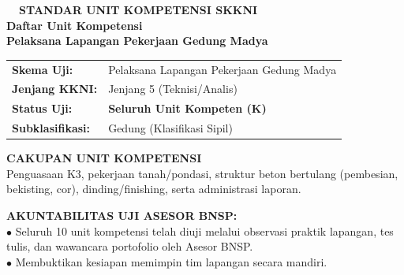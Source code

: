 \documentclass[10pt,a4paper,landscape]{article}
\begin{document}
\noindent
\begin{minipage}[t]{0.30\linewidth}
  \vspace{0pt}
  \begin{tcolorbox}[sharp corners, boxrule=0.8pt, colframe=pborder, colback=white, left=3mm, right=3mm, top=2.5mm, bottom=2.5mm, height=100mm]
    \colorbox{pred}{\fontsize{7pt}{8pt}\selectfont\bfseries\color{white}\ \ STANDAR UNIT KOMPETENSI SKKNI\ \ }\\[1.5mm]
    {\fontsize{9.5pt}{11.5pt}\selectfont\bfseries\color{pnavy}Daftar Unit Kompetensi}\\[0.5mm]
    {\fontsize{7pt}{8.5pt}\selectfont\bfseries\color{pred}Pelaksana Lapangan Pekerjaan Gedung Madya}\\[2mm]

    \begin{tcolorbox}[sharp corners, boxrule=0.5pt, colframe=pborder, colback=pbglight, left=2mm, right=2mm, top=1.5mm, bottom=1.5mm]
      \begin{tabularx}{\linewidth}{@{}p{22mm} X@{}}
        {\fontsize{6.8pt}{8pt}\selectfont\bfseries Skema Uji:} & {\fontsize{6.8pt}{8pt}\selectfont Pelaksana Lapangan Pekerjaan Gedung Madya} \\[0.8mm]
        {\fontsize{6.8pt}{8pt}\selectfont\bfseries Jenjang KKNI:} & {\fontsize{6.8pt}{8pt}\selectfont Jenjang 5 (Teknisi/Analis)} \\[0.8mm]
        {\fontsize{6.8pt}{8pt}\selectfont\bfseries Status Uji:} & {\fontsize{6.8pt}{8pt}\selectfont\bfseries\color{pred} Seluruh Unit Kompeten (K)} \\[0.8mm]
        {\fontsize{6.8pt}{8pt}\selectfont\bfseries Subklasifikasi:} & {\fontsize{6.8pt}{8pt}\selectfont Gedung (Klasifikasi Sipil)}
      \end{tabularx}
    \end{tcolorbox}
    \vspace{1.5mm}

    {\fontsize{7.5pt}{9pt}\selectfont\bfseries\color{pnavy}CAKUPAN UNIT KOMPETENSI}\\[0.8mm]
    {\fontsize{6.5pt}{8.2pt}\selectfont\color{psteel}
    Penguasaan K3, pekerjaan tanah/pondasi, struktur beton bertulang (pembesian, bekisting, cor), dinding/finishing, serta administrasi laporan.
    }
  \end{tcolorbox}
  \vspace{2mm}

  \begin{tcolorbox}[sharp corners, boxrule=0.6pt, colframe=pnavy, colback=pbglight, left=2.5mm, right=2.5mm, top=2mm, bottom=2mm, height=52mm]
    {\fontsize{7pt}{8.5pt}\selectfont\bfseries\color{pnavy}AKUNTABILITAS UJI ASESOR BNSP:}\\[1.5mm]
    {\fontsize{6.5pt}{8.2pt}\selectfont\color{psteel}
    $\bullet$ Seluruh 10 unit kompetensi telah diuji melalui observasi praktik lapangan, tes tulis, dan wawancara portofolio oleh Asesor BNSP.\\
    $\bullet$ Membuktikan kesiapan memimpin tim lapangan secara mandiri.
    }
  \end{tcolorbox}
\end{minipage}%
\end{document}
